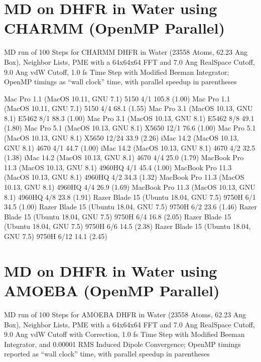 \documentclass[letterpaper,11pt,english]{sphinxmanual}
\begin{document}
\section{MD on DHFR in Water using CHARMM (OpenMP Parallel)}
\label{\detokenize{text/benchmarks:md-on-dhfr-in-water-using-charmm-openmp-parallel}}
MD run of 100 Steps for CHARMM DHFR in Water (23558 Atoms, 62.23 Ang Box), Neighbor Lists, PME with a 64x64x64 FFT and 7.0 Ang Real\sphinxhyphen{}Space Cutoff, 9.0 Ang vdW Cutoff, 1.0 fs Time Step with Modified Beeman Integrator; OpenMP timings as “wall clock” time, with parallel speedup in parentheses


\begin{sphinxVerbatim}[commandchars=\\\{\}]
Mac Pro 1.1 (MacOS 10.11, GNU 7.1)             5150           4/1       105.8 (1.00)
Mac Pro 1.1 (MacOS 10.11, GNU 7.1)             5150           4/4        68.1 (1.55)
Mac Pro 3.1 (MacOS 10.13, GNU 8.1)            E5462           8/1        88.3 (1.00)
Mac Pro 3.1 (MacOS 10.13, GNU 8.1)            E5462           8/8        49.1 (1.80)
Mac Pro 5.1 (MacOS 10.13, GNU 8.1)            X5650          12/1        76.6 (1.00)
Mac Pro 5.1 (MacOS 10.13, GNU 8.1)            X5650         12/24        33.9 (2.26)
iMac 14.2 (MacOS 10.13, GNU 8.1)               4670           4/1        44.7 (1.00)
iMac 14.2 (MacOS 10.13, GNU 8.1)               4670           4/2        32.5 (1.38)
iMac 14.2 (MacOS 10.13, GNU 8.1)               4670           4/4        25.0 (1.79)
MacBook Pro 11.3 (MacOS 10.13, GNU 8.1)      4960HQ           4/1        45.4 (1.00)
MacBook Pro 11.3 (MacOS 10.13, GNU 8.1)      4960HQ           4/2        34.3 (1.32)
MacBook Pro 11.3 (MacOS 10.13, GNU 8.1)      4960HQ           4/4        26.9 (1.69)
MacBook Pro 11.3 (MacOS 10.13, GNU 8.1)      4960HQ           4/8        23.8 (1.91)
Razer Blade 15 (Ubuntu 18.04, GNU 7.5)        9750H           6/1        34.5 (1.00)
Razer Blade 15 (Ubuntu 18.04, GNU 7.5)        9750H           6/2        23.6 (1.46)
Razer Blade 15 (Ubuntu 18.04, GNU 7.5)        9750H           6/4        16.8 (2.05)
Razer Blade 15 (Ubuntu 18.04, GNU 7.5)        9750H           6/6        14.5 (2.38)
Razer Blade 15 (Ubuntu 18.04, GNU 7.5)        9750H          6/12        14.1 (2.45)
\end{sphinxVerbatim}


\section{MD on DHFR in Water using AMOEBA (OpenMP Parallel)}
\label{\detokenize{text/benchmarks:md-on-dhfr-in-water-using-amoeba-openmp-parallel}}
MD run of 100 Steps for AMOEBA DHFR in Water (23558 Atoms, 62.23 Ang Box), Neighbor Lists, PME with a 64x64x64 FFT and 7.0 Ang Real\sphinxhyphen{}Space Cutoff, 9.0 Ang vdW Cutoff with Correction, 1.0 fs Time Step with Modified Beeman Integrator, and 0.00001 RMS Induced Dipole Convergence; OpenMP timings reported as “wall clock” time, with parallel speedup in parentheses
\end{document}
